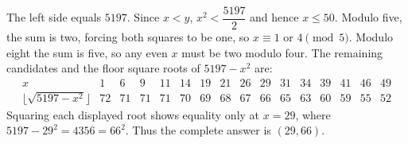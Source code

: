 The left side equals $5197$. Since $x<y$, $x^2<\dfrac{5197}{2}$ and hence $x\le50$. Modulo five, the sum is two, forcing both squares to be one, so $x\equiv1$ or $4\pmod5$. Modulo eight the sum is five, so any even $x$ must be two modulo four. The remaining candidates and the floor square roots of $5197-x^2$ are:
\[\begin{array}{c|rrrrrrrrrrrrrrr}x&1&6&9&11&14&19&21&26&29&31&34&39&41&46&49\\ \lfloor\sqrt{5197-x^2}\rfloor&72&71&71&71&70&69&68&67&66&65&63&60&59&55&52\end{array}\]
Squaring each displayed root shows equality only at $x=29$, where $5197-29^2=4356=66^2$. Thus the complete answer is $\boxed{(29,66)}$.
